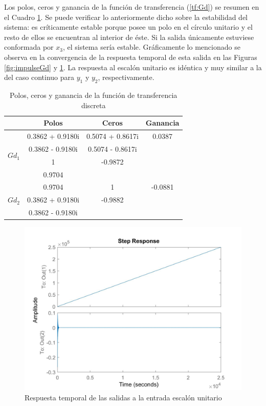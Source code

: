 \documentclass[journal]{IEEEtran}
\begin{document}
Los polos, ceros y ganancia de la función de transferencia (\ref{tf:Gd}) se resumen en el Cuadro \ref{tab: pzg tfd}. Se puede verificar lo anteriormente dicho sobre la estabilidad del sistema: es críticamente estable porque posee un polo en el círculo unitario y el resto de ellos se encuentran al interior de éste. Si la salida únicamente estuviese conformada por $x_3$, el sistema sería estable. Gráficamente lo mencionado se observa en la convergencia de la respuesta temporal de esta salida en las Figuras \ref{fig:impulseGd} y \ref{fig:stepGd}. La respuesta al escalón unitario es idéntica y muy similar a la del caso continuo para $y_1$ y $y_2$, respectivamente.\\

\begin{table}[!h]
\centering
\caption{Polos, ceros y ganancia de la función de transferencia discreta}
\label{tab: pzg tfd}
\begin{tabular}{@{}lccc@{}}
\toprule
                  & Polos & Ceros             & Ganancia          \\ \midrule
\multirow{4}{*}{$Gd_1$} & 0.3862 + 0.9180i & 0.5074 + 0.8617i & 0.0387 \\
                  & 0.3862 - 0.9180i & 0.5074 - 0.8617i &                   \\
                  & 1 & -0.9872 &                   \\
                  & 0.9704 & &                   \\    
                 \midrule
\multirow{4}{*}{$Gd_2$} & 0.9704 & 1 & -0.0881 \\
                  & 0.3862 + 0.9180i & -0.9882 &                   \\  
                  &  0.3862 - 0.9180i &  &
                  \\ \bottomrule
\end{tabular}
\end{table}

\begin{figure}[!h]
\caption{Respuesta temporal de las salidas a la entrada escalón unitario\label{fig:stepGd}}
  \centering
\includegraphics[scale=0.18]{tf/step_Gd.jpg}
\end{figure}
\end{document}
